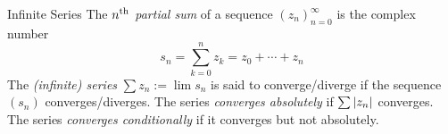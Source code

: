 % 
% 
% 
% 
% 
% 

\begin{defn}{Infinite Series}{}
	The \emph{$n\textsuperscript{th}$ partial sum} of a sequence $(z_n)_{n=0}^\infty$ is the complex number
	\[
		s_n=\sum_{k=0}^nz_k=z_0+\cdots +z_n
	\]
	\vspace{-2pt}The \emph{(infinite) series} $\sum z_n:= \lim s_n$ is said to converge/diverge if the sequence $(s_n)$ converges/diverges.\smallbreak
	The series \emph{converges absolutely} if $\sum \left| z_n\right|$ converges.\smallbreak
	The series \emph{converges conditionally} if it converges but not absolutely.
\end{defn}

